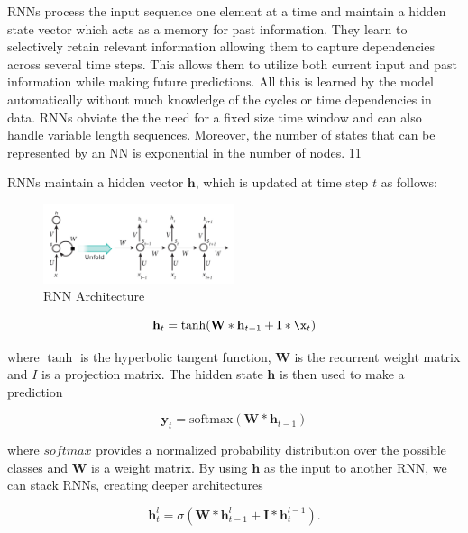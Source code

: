 \documentclass[5p]{elsarticle}
\begin{document}
RNNs process the input sequence one element at a time and maintain a hidden
state vector which acts as a memory for past information. They learn to selectively retain relevant information allowing them to capture dependencies across several time steps. This allows them to utilize both current input and past information while making future predictions. All this is learned by the model automatically without much knowledge of the cycles or time dependencies in data. RNNs obviate the the need for a fixed size time window and can also handle variable length sequences. Moreover, the number of states that can be represented by an NN is exponential in the number of nodes.
11

RNNs maintain a hidden vector $\mathbf h$, which is updated at time step $t$ as follows:
 
\begin{figure}[h]
    \centering
    \includegraphics[width=0.5\textwidth]{RNN.png}
    \caption{RNN Architecture}
    \label{fig:RNN}
\end{figure}

\begin{equation}
	\mathbf h_t = \tanh(\mathbf W * \mathbf h_{t-1} + \mathbf I * \x_t)
\end{equation}

where $\tanh$ is the hyperbolic tangent function, $\mathbf W$ is the recurrent weight matrix and $I$ is a projection matrix. The hidden state $\mathbf h$ is then used to make a prediction

\begin{equation}
	\mathbf y_t = \text{softmax}(\mathbf W * \mathbf h_{t-1})
\end{equation}

where $\textit{softmax}$ provides a normalized probability distribution over the possible classes and $\mathbf W$ is a weight matrix. By using $\mathbf h$ as the input to another RNN, we can stack RNNs, creating deeper architectures \citep{pascanu2013construct}

\begin{equation}
	\mathbf h_t^{l} = \sigma(\mathbf W * \mathbf h_{t-1}^{l} + \mathbf I * \mathbf h_t^{l-1}).
\end{equation}
\end{document}
